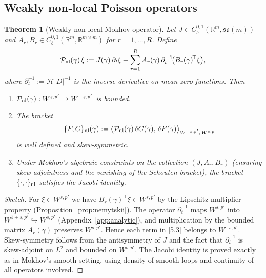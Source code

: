 \documentclass{amsart}
\newcounter{thm}
\newcounter{ex}
\newcounter{re}
\newtheorem{theorem}[thm]{Theorem}
\begin{document}
\subsection{Weakly non‑local Poisson operators}
\begin{theorem}[Weakly non‑local Mokhov operator]\label{th:nonlocal-P}
Let \(J\in C^{0,1}_{b}(\mathbb R^{m},\mathfrak{so}(m))\) and
\(A_{r},B_{r}\in C^{0,1}_{b}(\mathbb R^{m},\mathbb R^{m\times m})\) for
\(r=1,\dots,R\).  Define
\begin{equation}
\mathcal P_{\rm nl}(\gamma)\,\xi
   := J(\gamma)\,\partial_{t}\xi
      +\sum_{r=1}^{R}
         A_{r}(\gamma)\,
         \partial_{t}^{-1}\!
         \bigl(B_{r}(\gamma)^{\!\top}\xi\bigr),
\label{5.3}
\end{equation}
where \(\partial_{t}^{-1}:=\mathcal H|D|^{-1}\) is the inverse derivative on mean‑zero functions.
Then
\begin{enumerate}[label=(\roman*)]
  \item \(\mathcal P_{\rm nl}(\gamma):W^{s,p'}\to W^{-s,p'}\) is bounded.
  \item The bracket
  \begin{equation}
  \{F,G\}_{\rm nl}(\gamma)
    :=\big\langle\mathcal P_{\rm nl}(\gamma)\,\delta G(\gamma),\,
               \delta F(\gamma)\big\rangle_{W^{-s,p'},\,W^{s,p}}
  \label{5.4}
  \end{equation}
  is well defined and skew‑symmetric.
  \item Under Mokhov’s algebraic constraints on the collection
        \((J,A_{r},B_{r})\) (ensuring skew‑adjointness and the vanishing of the
        Schouten bracket), the bracket \(\{\cdot,\cdot\}_{\rm nl}\) satisfies the Jacobi identity.
\end{enumerate}
\end{theorem}
\begin{proof}[Sketch]
For \(\xi\in W^{s,p'}\) we have \(B_{r}(\gamma)^{\!\top}\xi\in W^{s,p'}\) by the
Lipschitz multiplier property (Proposition~\ref{prop:nemytskii}).
The operator \(\partial_{t}^{-1}\) maps \(W^{s,p'}\) into \(W^{1+s,p'}\hookrightarrow
W^{s,p'}\) (Appendix~\ref{app:analytic}), and multiplication by the bounded
matrix \(A_{r}(\gamma)\) preserves \(W^{s,p'}\).  Hence each term in \eqref{5.3}
belongs to \(W^{-s,p'}\).  Skew‑symmetry follows from the antisymmetry of \(J\)
and the fact that \(\partial_{t}^{-1}\) is skew‑adjoint on \(L^{2}\) and bounded on
\(W^{s,p'}\).  The Jacobi identity is proved exactly as in Mokhov’s smooth
setting, using density of smooth loops and continuity of all operators involved.
\end{proof}
\end{document}
